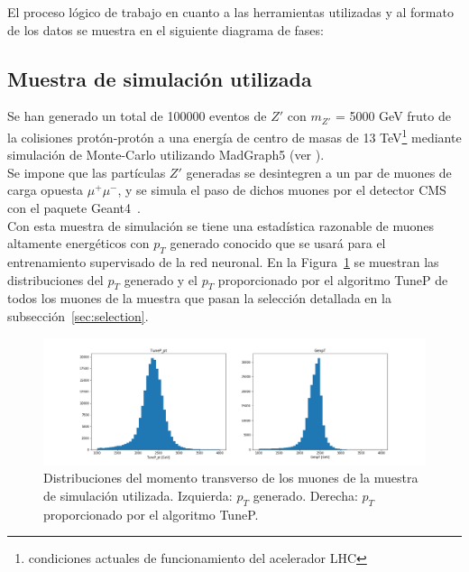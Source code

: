 El proceso l\'ogico de trabajo en cuanto a las herramientas utilizadas y al formato de los datos se muestra en el siguiente diagrama de fases: 

\begin{center}
\end{center}


\subsection{Muestra de simulaci\'on utilizada}\label{sec:sample}

Se han generado un total de 100000 eventos de $Z'$ con $m_{Z'}$ = 5000 GeV fruto de la colisiones prot\'on-prot\'on a una energ\'ia de centro de masas de 13 TeV\footnote{condiciones actuales de funcionamiento del acelerador LHC} mediante simulaci\'on de Monte-Carlo utilizando MadGraph5 (ver \cite{generator}). \\
Se impone que las part\'iculas $Z'$ generadas se desintegren a un par de muones de carga opuesta $\mu^{+}\mu^{-}$, y se simula el paso de dichos muones por el detector CMS con el paquete Geant4~\cite{Agostinelli:2002hh}. \\

Con esta muestra de simulaci\'on se tiene una estad\'istica razonable de muones altamente energ\'eticos con $p_{T}$ generado conocido que se usar\'a para el entrenamiento supervisado de la red neuronal. En la Figura~\ref{fig:data_pt} se muestran las distribuciones del $p_{T}$ generado y el $p_{T}$ proporcionado por el algoritmo TuneP de todos los muones de la muestra que pasan la selecci\'on detallada en la subsecci\'on~\ref{sec:selection}.

\begin{figure}[h]
\centering
\includegraphics[width=1.0\textwidth]{figures/data_pt.png}
\caption{Distribuciones del momento transverso de los muones de la muestra de simulaci\'on utilizada. Izquierda: $p_{T}$ generado. Derecha: $p_{T}$ proporcionado por el algoritmo TuneP.}
\label{fig:data_pt}        
\end{figure}


